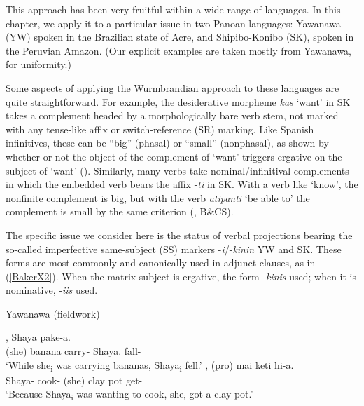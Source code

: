 \documentclass[output=paper]{langscibook}
\begin{document}
This approach has been very fruitful within a wide range of languages. In this chapter, we apply it to a particular issue in two Panoan languages: Yawanawa (YW) spoken in the Brazilian state of Acre, and Shipibo-Konibo (SK), spoken in the Peruvian Amazon. (Our explicit examples are taken mostly from Yawanawa, for uniformity.)

Some aspects of applying the Wurmbrandian approach to these languages are quite straightforward. For example, the desiderative morpheme \textit{kas} `want’ in SK takes a complement headed by a morphologically bare verb stem, not marked with any tense-like affix or switch-ref\-er\-ence (SR) marking. Like Spanish infinitives, these can be “big” (phasal) or “small” (nonphasal), as shown by whether or not the object of the complement of `want’ triggers ergative on the subject of `want’ (\citealt[371--376]{baker2014dependent}). Similarly, many verbs take nominal\slash infinitival complements in which the embedded verb bears the affix -\textit{ti} in SK. With a verb like `know’, the nonfinite complement is big, but with the verb \textit{atipanti} `be able to’ the complement is small by the same criterion (\citealt[17]{baker2020agree}, B\&CS).

The specific issue we consider here is the status of verbal projections bearing the so-called imperfective same-subject (SS) markers -\textit{i}/-\textit{kinin} YW and SK. These forms are most commonly and canonically used in adjunct clauses, as in (\ref{BakerX2}). When the matrix subject is ergative, the form -\textit{kinis} used; when it is nominative, -\textit{iis} used.

\begin{exe}
    \ex Yawanawa (fieldwork) \label{BakerX2}
	    \begin{xlist}
			\ex \label{BakerX2a}
			, Shaya pake-a.\\
			     (she) banana carry- Shaya. fall-\\
			    \glt `While she\textsubscript{i} was carrying bananas, Shaya\textsubscript{i} fell.'
			\ex \label{BakerX2b}
			, (pro) mai  keti  hi-a.\\
    			 Shaya- cook- (she) clay pot get-\\
			    \glt `Because Shaya\textsubscript{i} was wanting to cook, she\textsubscript{i} got a clay pot.'
		\end{xlist}
\end{exe}
\end{document}
